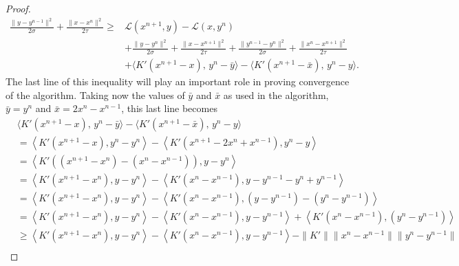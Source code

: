 \documentclass[10pt,a4paper]{amsart}
\begin{document}
\begin{proof}
    \begin{align*}
    \frac{\|y-y^{n-1}\|^2}{2\sigma}+\frac{\|x-x^n\|^2}{2\tau} \geq& \mathcal{L}(x^{n+1},y)- \mathcal{L}(x,y^n)\\ &+ \frac{\|y-y^{n}\|^2}{2\sigma}+\frac{\|x-x^{n+1}\|^2}{2\tau} + \frac{\|y^{n-1}-y^{n}\|^2}{2\sigma}+\frac{\|x^n-x^{n+1}\|^2}{2\tau}\\ &+ \langle K' (x^{n+1} - x),\, y^{n} - \bar{y}\rangle - \langle K' (x^{n+1}-\bar{x}),\,y^{n} -y \rangle.
    \end{align*}
    The last line of this inequality will play an important role in proving convergence of the algorithm. Taking now the values of $\bar{y}$ and $\bar{x}$ as used in the algorithm, $\bar{y}=y^n$ and $\bar{x}=2x^{n}-x^{n-1}$, this last line becomes
    \begin{align*}
        &\langle K' (x^{n+1} - x),\, y^{n} - \bar{y}\rangle - \langle K' (x^{n+1}-\bar{x}),\,y^{n} -y \rangle \\
        &=\left \langle K'(x^{n+1}-x), y^{n}-y^n\right \rangle - \left \langle K'(x^{n+1}-2x^n+x^{n-1}), y^{n}-y\right \rangle \\
        &= \left \langle K'((x^{n+1}-x^n)-(x^n-x^{n-1})), y-y^{n}\right \rangle \\
        &= \left \langle K'(x^{n+1}-x^n), y-y^{n}\right \rangle - \left \langle K'(x^n-x^{n-1}), y-y^{n-1}-y^{n}+y^{n-1}\right \rangle\\
        &= \left \langle K'(x^{n+1}-x^n), y-y^{n}\right \rangle - \left \langle K'(x^n-x^{n-1}), (y-y^{n-1})-(y^{n}-y^{n-1})\right \rangle\\
        &= \left \langle K'(x^{n+1}-x^n), y-y^{n}\right \rangle - \left \langle K'(x^n-x^{n-1}), y-y^{n-1}\right \rangle + \left \langle K'(x^n-x^{n-1}), (y^{n}-y^{n-1})\right \rangle\\
        &\ge \left \langle K'(x^{n+1}-x^n), y-y^{n}\right \rangle - \left \langle K'(x^n-x^{n-1}), y-y^{n-1}\right \rangle - \|K'\|\|x^n-x^{n-1}\|\|y^{n}-y^{n-1}\|\\
    \end{align*}


\end{proof}
\end{document}
